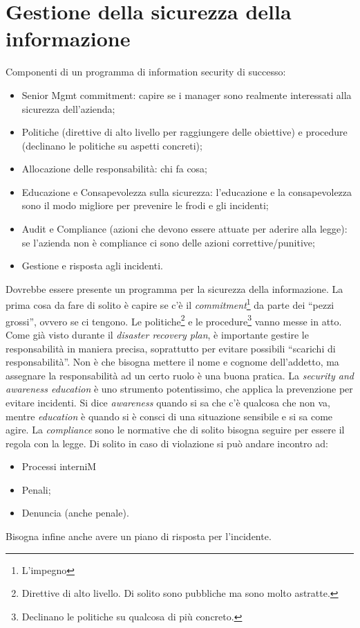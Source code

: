 \section{Gestione della sicurezza della informazione}

Componenti di un programma di information security di successo:

\begin{itemize}
\item Senior Mgmt commitment: capire se i manager sono realmente interessati
alla sicurezza dell'azienda;
\item Politiche (direttive di alto livello per raggiungere delle obiettive) e
procedure (declinano le politiche su aspetti concreti);
\item Allocazione delle responsabilità: chi fa cosa;
\item Educazione e Consapevolezza sulla sicurezza: l'educazione e la
consapevolezza sono il modo migliore per prevenire le frodi e gli incidenti;
\item Audit e Compliance (azioni che devono essere attuate per aderire alla
legge): se l'azienda non è compliance ci sono delle azioni correttive/punitive;
\item Gestione e risposta agli incidenti.
\end{itemize}

Dovrebbe essere presente un programma per la sicurezza della informazione. La
prima cosa da fare di solito è capire se c'è il
\textit{commitment}\footnote{L'impegno} da parte dei ``pezzi grossi'', ovvero
se ci tengono. Le politiche\footnote{Direttive di alto livello. Di solito sono
pubbliche ma sono molto astratte.} e le procedure\footnote{Declinano le
politiche su qualcosa di più concreto.} vanno messe in atto. Come già visto
durante il \textit{disaster recovery plan}, è importante gestire le
responsabilità in maniera precisa, soprattutto per evitare possibili ``scarichi
di responsabilità''. Non è che bisogna mettere il nome e cognome dell'addetto,
ma assegnare la responsabilità ad un certo ruolo è una buona pratica. La
\textit{security and awareness education} è uno strumento potentissimo, che
applica la prevenzione per evitare incidenti. Si dice \textit{awareness} quando
si sa che c'è qualcosa che non va, mentre \textit{education} è quando si è
consci di una situazione sensibile e si sa come agire.
La \textit{compliance} sono le normative che di solito bisogna seguire per
essere il regola con la legge. Di solito in caso di violazione si può andare
incontro ad:
\begin{itemize}
  \item Processi interniM
  \item Penali;
  \item Denuncia (anche penale).
\end{itemize}
Bisogna infine anche avere un piano di risposta per l'incidente.

